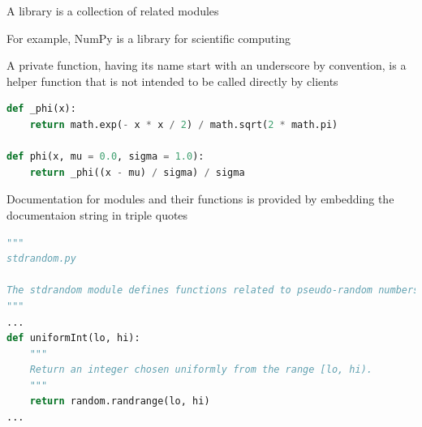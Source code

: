 \documentclass[8pt,a4paper,compress]{beamer}
\begin{document}
\begin{frame}[fragile]
\pause

A library is a collection of related modules

\pause
\bigskip

For example, NumPy is a library for scientific computing

\pause
\bigskip

A private function, having its name start with an underscore by convention, is a helper function that is not intended to be called directly by clients
\begin{lstlisting}[language=Python]
def _phi(x):
    return math.exp(- x * x / 2) / math.sqrt(2 * math.pi)
    
def phi(x, mu = 0.0, sigma = 1.0):
    return _phi((x - mu) / sigma) / sigma
\end{lstlisting}

\pause
\bigskip

Documentation for modules and their functions is provided by embedding the documentaion string in triple quotes
\begin{lstlisting}[language=Python]
"""
stdrandom.py

The stdrandom module defines functions related to pseudo-random numbers.
"""
...
def uniformInt(lo, hi):
    """
    Return an integer chosen uniformly from the range [lo, hi).
    """
    return random.randrange(lo, hi)
...
\end{lstlisting}
\end{frame}
\end{document}
